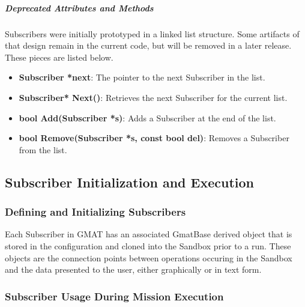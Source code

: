 \subparagraph{\textit{Deprecated Attributes and Methods}}

Subscribers were initially prototyped in a linked list structure.  Some artifacts of that design
remain in the current code, but will be removed in a later release.  These pieces are listed below.

\begin{itemize}
\item \textbf{Subscriber *next}: The pointer to the next Subscriber in the list.
\item \textbf{Subscriber* Next()}: Retrieves the next Subscriber for the current list.
\item \textbf{bool Add(Subscriber *s)}: Adds a Subscriber at the end of the list.
\item \textbf{bool Remove(Subscriber *s, const bool del)}: Removes a Subscriber from the list.
\end{itemize}

\subsection{Subscriber Initialization and Execution}

\subsubsection{Defining and Initializing Subscribers}

Each Subscriber in GMAT has an associated GmatBase derived object that is stored in the
configuration and cloned into the Sandbox prior to a run.  These objects are the connection points
between operations occuring in the Sandbox and the data presented to the user, either graphically
or in text form.

\subsubsection{Subscriber Usage During Mission Execution}

